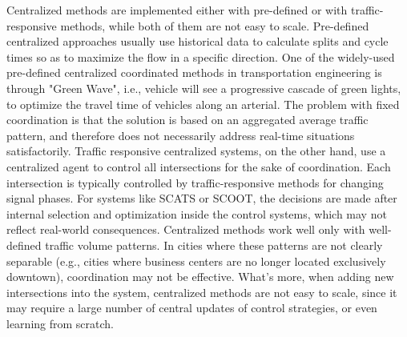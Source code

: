 {Centralized methods are implemented either with pre-defined or with traffic-responsive methods, while both of them are not easy to scale.  Pre-defined centralized approaches usually use historical data to calculate splits and cycle times so as to maximize the flow in a specific direction. One of the widely-used pre-defined centralized coordinated methods in transportation engineering is through "Green Wave", i.e., vehicle will see a progressive cascade of green lights, to optimize the travel time of vehicles along an arterial. The problem with fixed coordination is that the solution is based on an aggregated average traffic pattern, and therefore does not necessarily address real-time situations satisfactorily. Traffic responsive centralized systems, on the other hand, use a centralized agent to control all intersections for the sake of coordination. Each intersection is typically controlled by traffic-responsive methods for changing signal phases. For systems like SCATS or SCOOT, the decisions are made after internal selection and optimization inside the control systems, which may not reflect real-world consequences. Centralized methods work well only with well-defined traffic volume patterns. In cities where these patterns are not clearly separable (e.g., cities where business centers are no longer located exclusively downtown), coordination may not be effective. What's more, when adding new intersections into the system, centralized methods are not easy to scale, since it may require a large number of central updates of control strategies, or even learning from scratch. 


}
